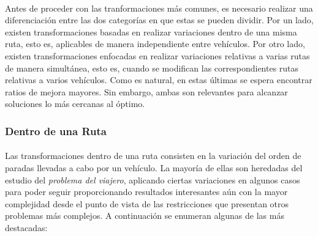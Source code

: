 \documentclass{subfiles}
\begin{document}
        \paragraph{}
        Antes de proceder con las tranformaciones más comunes, es necesario realizar una diferenciación entre las dos categorías en que estas se pueden dividir. Por un lado, existen transformaciones basadas en realizar variaciones dentro de una misma ruta, esto es, aplicables de manera independiente entre vehículos. Por otro lado, existen transformaciones enfocadas en realizar variaciones relativas a varias rutas de manera simultánea, esto es, cuando se modifican las correspondientes rutas relativas a varios vehículos. Como es natural, en estas últimas se espera encontrar ratios de mejora mayores. Sin embargo, ambas son relevantes para alcanzar soluciones lo más cercanas al óptimo.

        \subsubsection{Dentro de una Ruta}
        \label{sec:solving_local_search_inner}

          \paragraph{}
          Las transformaciones dentro de una ruta consisten en la variación del orden de paradas llevadas a cabo por un vehículo. La mayoría de ellas son heredadas del estudio del \emph{problema del viajero}, aplicando ciertas variaciones en algunos casos para poder seguir proporcionando resultados interesantes aún con la mayor complejidad desde el punto de vista de las restricciones que presentan otros problemas más complejos. A continuación se enumeran algunas de las más destacadas:
\end{document}

